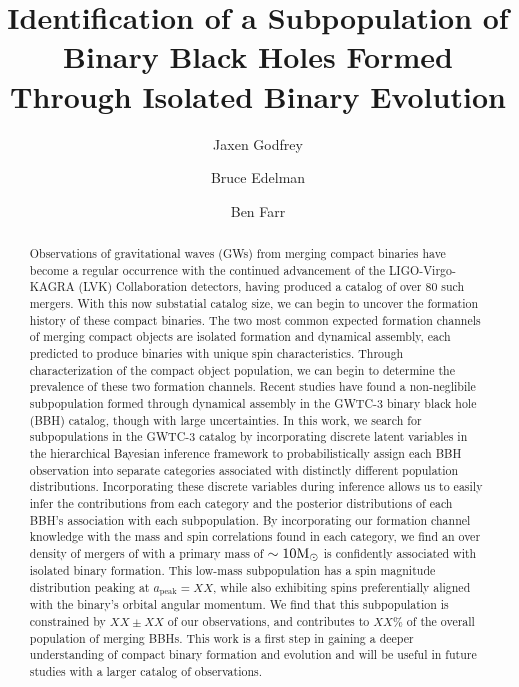 \documentclass[twocolumn, linenumbers]{aastex631}
\newcommand{\msun}{\ensuremath{{\rm M}_\odot}}
\begin{document}
\title{Identification of a Subpopulation of Binary Black Holes Formed Through Isolated Binary Evolution}

\author{Jaxen Godfrey}
\author{Bruce Edelman}
\author{Ben Farr}

\begin{abstract}
    Observations of gravitational waves (GWs) from merging compact binaries have become a regular occurrence with the continued advancement of the LIGO-Virgo-KAGRA (LVK) Collaboration detectors, having produced a catalog of over 80 such mergers. With this now substatial catalog size, we can begin to uncover the formation history of these compact binaries. The two most common expected formation channels of merging compact objects are isolated formation and dynamical assembly, each predicted to produce binaries with unique spin characteristics. Through characterization of the compact object population, we can begin to determine the prevalence of these two formation channels. Recent studies have found a non-neglibile subpopulation formed through dynamical assembly in the GWTC-3 binary black hole (BBH) catalog, though with large uncertainties. In this work, we search for subpopulations in the GWTC-3 catalog by incorporating discrete latent variables in the hierarchical Bayesian inference framework to probabilistically assign each BBH observation into separate categories associated with distinctly different population distributions. Incorporating these discrete variables during inference allows us to easily infer the contributions from each category and the posterior distributions of each BBH's association with each subpopulation. By incorporating our formation channel knowledge with the mass and spin correlations found in each category, we find an over density of mergers of with a primary mass of $\sim10\msun$ is confidently associated with isolated binary formation. This low-mass subpopulation has a spin magnitude distribution peaking at $a_\mathrm{peak}=XX$, while also exhibiting spins preferentially aligned with the binary's orbital angular momentum. We find that this subpopulation is constrained by $XX \pm XX$ of our observations, and contributes to $XX\%$ of the overall population of merging BBHs. This work is a first step in gaining a deeper understanding of compact binary formation and evolution and will be useful in future studies with a larger catalog of observations. 
\end{abstract}
\end{document}
